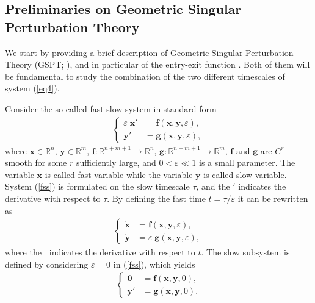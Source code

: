 \documentclass[11pt,reqno]{amsart}
\theoremstyle{boldremark}
\begin{document}
\subsection{Preliminaries on Geometric Singular Perturbation Theory} \label{GSPT} 

\noindent We start by providing a brief description of Geometric Singular Perturbation Theory (GSPT; \cite{2,23,40,0}), and in particular of the entry-exit function \cite{35}. Both of them will be fundamental to study the combination of the two different timescales of system (\ref{eq4}).

Consider the so-called fast-slow system in standard form 
\begin{align} \label{fss}
\left\{
\begin{aligned}
    \varepsilon \; \mathbf{x}' &= \mathbf{f}(\mathbf{x}, \mathbf{y}, \varepsilon), \\ 
    \mathbf{y}' &= \mathbf{g}(\mathbf{x}, \mathbf{y}, \varepsilon),
\end{aligned}
\right.
\end{align}
where $\mathbf{x}\in \mathbb{R}^n$, $\mathbf{y}\in \mathbb{R}^m$, $\mathbf{f}\colon \mathbb{R}^{n+m+1} \to \mathbb{R}^n$, $\mathbf{g}\colon \mathbb{R}^{n+m+1} \to \mathbb{R}^m$, $\mathbf{f}$ and $\mathbf{g}$ are $C^r$-smooth for some $r$ sufficiently large, and $0< \varepsilon \ll 1$ is a small parameter. The variable $\mathbf{x}$ is called fast variable while the variable $\mathbf{y}$ is called slow variable. System (\ref{fss}) is formulated on the slow timescale $\tau$, and the $'$ indicates the derivative with respect to $\tau$. By defining the fast time $t=\tau/\varepsilon$ it can be rewritten as
\begin{align} \label{fss_bis}
\left\{
\begin{aligned}
    \dot{\mathbf{x}} &= \mathbf{f}(\mathbf{x}, \mathbf{y}, \varepsilon), \\ 
    \dot{\mathbf{y}} &= \varepsilon \; \mathbf{g}(\mathbf{x}, \mathbf{y}, \varepsilon),
\end{aligned}
\right.
\end{align}
where the $^\cdot$ indicates the derivative with respect to $t$. The slow subsystem is defined by considering $\varepsilon=0$ in (\ref{fss}), which yields 
\begin{align} \label{fss_0}
\left\{
\begin{aligned}
    \mathbf{0} &= \mathbf{f}(\mathbf{x}, \mathbf{y}, 0), \\ 
    \mathbf{y}' &= \mathbf{g}(\mathbf{x}, \mathbf{y}, 0).
\end{aligned}
\right.
\end{align}
\end{document}
